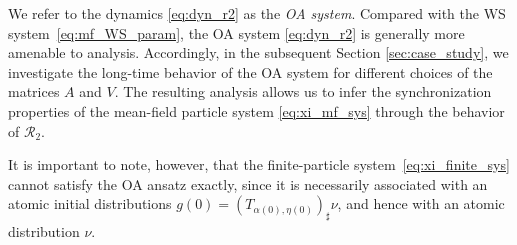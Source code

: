 \documentclass[10pt]{article}
\theoremstyle{definition}
\theoremstyle{definition}
\numberwithin{equation}{section}
\newcommand{\CR}{\mathcal{R}}
\begin{document}
We refer to the dynamics \eqref{eq:dyn_r2} as the \emph{OA system}.
Compared with the WS system~\eqref{eq:mf_WS_param}, the OA system \eqref{eq:dyn_r2} is generally more amenable to analysis.
Accordingly, in the subsequent Section \ref{sec:case_study},
we investigate the long-time behavior of the OA system for different choices of the matrices $A$ and $V$.
The resulting analysis allows us to infer the synchronization properties of the mean-field particle system \eqref{eq:xi_mf_sys} through the behavior of $\CR_2$.

It is important to note, however, that the finite-particle system~\eqref{eq:xi_finite_sys} cannot satisfy the OA ansatz exactly, since it is necessarily associated with an atomic initial distributions $g(0) = (T_{\alpha(0), \eta(0)})_{\sharp} \nu$, and hence with an atomic distribution $\nu$.

\end{document}
